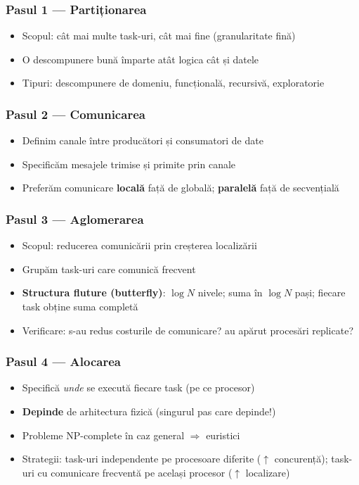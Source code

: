 \documentclass[a4paper,11pt]{article}
\begin{document}
\subsubsection{Pasul 1 — Partiționarea}
\begin{itemize}[noitemsep]
  \item Scopul: cât mai multe task-uri, cât mai fine (granularitate fină)
  \item O descompunere bună împarte atât logica cât și datele
  \item Tipuri: descompunere de domeniu, funcțională, recursivă, exploratorie
\end{itemize}

\subsubsection{Pasul 2 — Comunicarea}
\begin{itemize}[noitemsep]
  \item Definim canale între producători și consumatori de date
  \item Specificăm mesajele trimise și primite prin canale
  \item Preferăm comunicare \textbf{locală} față de globală; \textbf{paralelă} față de secvențială
\end{itemize}

\subsubsection{Pasul 3 — Aglomerarea}
\begin{itemize}[noitemsep]
  \item Scopul: reducerea comunicării prin creșterea localizării
  \item Grupăm task-uri care comunică frecvent
  \item \textbf{Structura fluture (butterfly)}: $\log N$ nivele; suma în $\log N$ pași; fiecare task obține suma completă
  \item Verificare: s-au redus costurile de comunicare? au apărut procesări replicate?
\end{itemize}

\subsubsection{Pasul 4 — Alocarea}
\begin{itemize}[noitemsep]
  \item Specifică \emph{unde} se execută fiecare task (pe ce procesor)
  \item \textbf{Depinde} de arhitectura fizică (singurul pas care depinde!)
  \item Probleme NP-complete în caz general $\Rightarrow$ euristici
  \item Strategii: task-uri independente pe procesoare diferite ($\uparrow$ concurență); task-uri cu comunicare frecventă pe același procesor ($\uparrow$ localizare)
\end{itemize}
\end{document}
